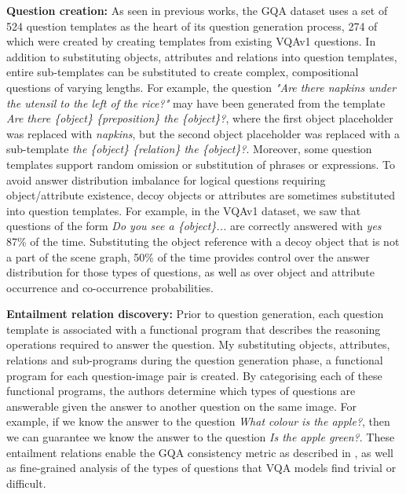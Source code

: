 \textbf{Question creation:} As seen in previous works, the GQA dataset uses a set of 524 question templates as the heart of its question generation process, 274 of which were created by creating templates from existing VQAv1 questions. In addition to substituting objects, attributes and relations into question templates, entire sub-templates can be substituted to create complex, compositional questions of varying lengths. For example, the question \textit{"Are there napkins under the utensil to the left of the rice?"} may have been generated from the template \textit{Are there \{object\} \{preposition\} the \{object\}?}, where the first object placeholder was replaced with \textit{napkins}, but the second object placeholder was replaced with a sub-template \textit{the \{object\} \{relation\} the \{object\}?}. Moreover, some question templates support random omission or substitution of phrases or expressions. To avoid answer distribution imbalance for logical questions requiring object/attribute existence, decoy objects or attributes are sometimes substituted into question templates. For example, in the VQAv1 dataset, we saw that questions of the form \textit{Do you see a \{object\}...} are correctly answered with \textit{yes} 87\% of the time. Substituting the object reference with a decoy object that is not a part of the scene graph, 50\% of the time provides control over the answer distribution for those types of questions, as well as over object and attribute occurrence and co-occurrence probabilities.

\textbf{Entailment relation discovery:} Prior to question generation, each question template is associated with a functional program that describes the reasoning operations required to answer the question. My substituting objects, attributes, relations and sub-programs during the question generation phase, a functional program for each question-image pair is created. By categorising each of these functional programs, the authors determine which types of questions are answerable given the answer to another question on the same image. For example, if we know the answer to the question \textit{What colour is the apple?}, then we can guarantee we know the answer to the question \textit{Is the apple green?}. These entailment relations enable the GQA consistency metric as described in \subsectionautorefname{ \ref{subsec:visual_reasoning_metrics}}, as well as fine-grained analysis of the types of questions that VQA models find trivial or difficult.

